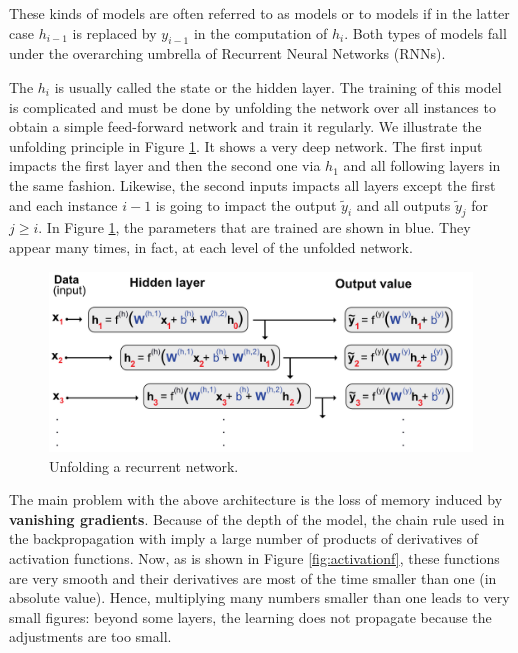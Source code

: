 \documentclass[]{krantz}
\theoremstyle{definition}
\theoremstyle{definition}
\theoremstyle{definition}
\theoremstyle{remark}
\begin{document}
These kinds of models are often referred to as \citet{elman1990finding}
models or to \citet{jordan1997serial} models if in the latter case
\(h_{i-1}\) is replaced by \(y_{i-1}\) in the computation of \(h_i\).
Both types of models fall under the overarching umbrella of Recurrent
Neural Networks (RNNs).

The \(h_i\) is usually called the state or the hidden layer. The
training of this model is complicated and must be done by unfolding the
network over all instances to obtain a simple feed-forward network and
train it regularly. We illustrate the unfolding principle in Figure
\ref{fig:recnet}. It shows a very deep network. The first input impacts
the first layer and then the second one via \(h_1\) and all following
layers in the same fashion. Likewise, the second inputs impacts all
layers except the first and each instance \(i-1\) is going to impact the
output \(\tilde{y}_i\) and all outputs \(\tilde{y}_j\) for \(j \ge i\).
In Figure \ref{fig:recnet}, the parameters that are trained are shown in
blue. They appear many times, in fact, at each level of the unfolded
network.

\begin{figure}[H]

{\centering \includegraphics[width=480px]{images/RN} 

}

\caption{Unfolding a recurrent network.}\label{fig:recnet}
\end{figure}

The main problem with the above architecture is the loss of memory
induced by \textbf{vanishing gradients}. Because of the depth of the
model, the chain rule used in the backpropagation with imply a large
number of products of derivatives of activation functions. Now, as is
shown in Figure \ref{fig:activationf}, these functions are very smooth
and their derivatives are most of the time smaller than one (in absolute
value). Hence, multiplying many numbers smaller than one leads to very
small figures: beyond some layers, the learning does not propagate
because the adjustments are too small.
\end{document}
